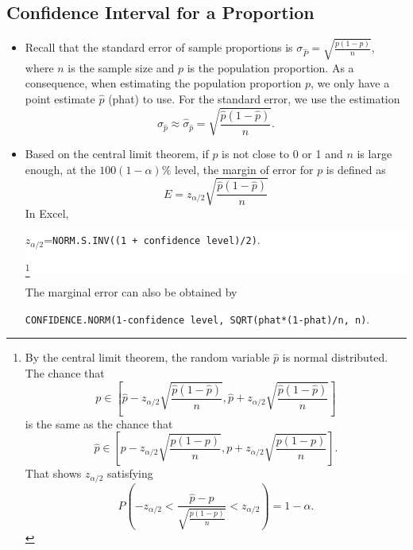 
\hypertarget{confidence-interval-for-a-proportion}{%
\subsection{Confidence Interval for a
Proportion}}

\begin{itemize}
\item
  Recall that the standard error of sample proportions is
  \(\sigma_{\hat{P}}=\sqrt{\frac{p(1-p)}{n}}\), where \(n\) is the
  sample size and \(p\) is the population proportion. As a consequence,
  when estimating the population proportion \(p\), we only have a point
  estimate \(\hat{p}\) (phat) to use. For the standard error, we use the
  estimation
  \[\sigma_{\hat{p}}\approx\hat{\sigma}_{\hat{p}}=\sqrt{\dfrac{\hat{p}(1-\hat{p})}{n}}.\]

\item
  Based on the central limit theorem, if $p$ is not close to 0 or 1 and \(n\) is large enough, at the
  \(100(1-\alpha)\%\) level, the margin of error for \(p\) is defined as
  \[E=z_{\alpha/2}\sqrt{\frac{\hat{p}(1-\hat{p})}{n}}\]
  In Excel,\\
  \begin{fullwidth}\raggedleft
    \colorbox{white}{
      \(z_{\alpha/2}\)=\texttt{NORM.S.INV((1\ +\ confidence\ level)/2)}.
  
      \footnote{\footnotesize
        By the central limit theorem, the random variable \(\hat{p}\) is
      normal distributed. The chance that
      \[p\in \left[\hat{p}-z_{\alpha/2}\sqrt{\frac{\hat{p}(1-\hat{p})}{n}}, \hat{p}+z_{\alpha/2}\sqrt{\frac{\hat{p}(1-\hat{p})}{n}}\right]\]
      is the same as the chance that
      \[\hat{p}\in \left[p-z_{\alpha/2}\sqrt{\frac{p(1-p)}{n}}, p+z_{\alpha/2}\sqrt{\frac{p(1-p)}{n}}\right].\]
      That shows \(z_{\alpha/2}\) satisfying
      \[P(-z_{\alpha/2}<\dfrac{\hat{p}-p}{\sqrt{\frac{p(1-p)}{n}}}<z_{\alpha/2})=1-\alpha.\]
      }
    }
  \end{fullwidth}

  The marginal error can also be obtained by

  \begin{fullwidth}
    \colorbox{white}{
      \texttt{CONFIDENCE.NORM(1-confidence\ level,\ SQRT(phat*(1-phat)/n,\ n)}.
    }
  \end{fullwidth}


\end{itemize}
